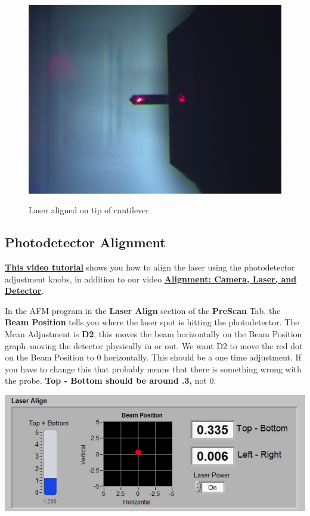 \documentclass{../lab}
\begin{document}
\begin{enumerate}
\begin{itemize}
        \begin{figure}[H]
        \centering
            \href{http://experimentationlab.berkeley.edu/sites/default/files/AFMImages/laser_align.png}{\includegraphics[width=0.5\linewidth]{images/laser_align.png}}
            \caption{Laser aligned on tip of cantilever}
            \label{LaserAlignment}
        \end{figure}
    \end{itemize}

\end{enumerate}

\subsection{Photodetector Alignment}
\label{subsec:PhotodetectorAlignment}

\href{http://experimentationlab.berkeley.edu/sites/default/files/AFMImages/5.0\%20\%20Phtodetector\%20Alignment\%28V1.0\%29.wmv}{\textbf{This video tutorial}} shows you how to align the laser using the photodetector adjustment knobs, in addition to our video  \href{http://experimentationlab.berkeley.edu/sites/default/files/alignment\_final2.mp4}{\textbf{Alignment: Camera, Laser, and Detector}}.

In the AFM program in the\textbf{ Laser Align} section of the \textbf{PreScan} Tab, the \textbf{Beam Position} tells you where the laser spot is hitting the photodetector. The Mean Adjustment is \textbf{D2}, this moves the beam horizontally on the Beam Position graph--moving the detector physically in or out.  We want D2 to move the red dot on the Beam Position to 0 horizontally.  This should be a one time adjustment.  If you have to change this that probably means that there is something wrong with the probe. \textbf{Top - Bottom should be around .3,} not 0.

\begin{center}
    \href{http://experimentationlab.berkeley.edu/sites/default/files/AFMImages/detectoralign.JPG}{\includegraphics[width=0.65\linewidth]{images/detectoralign.JPG}}
\end{center}
\end{document}
